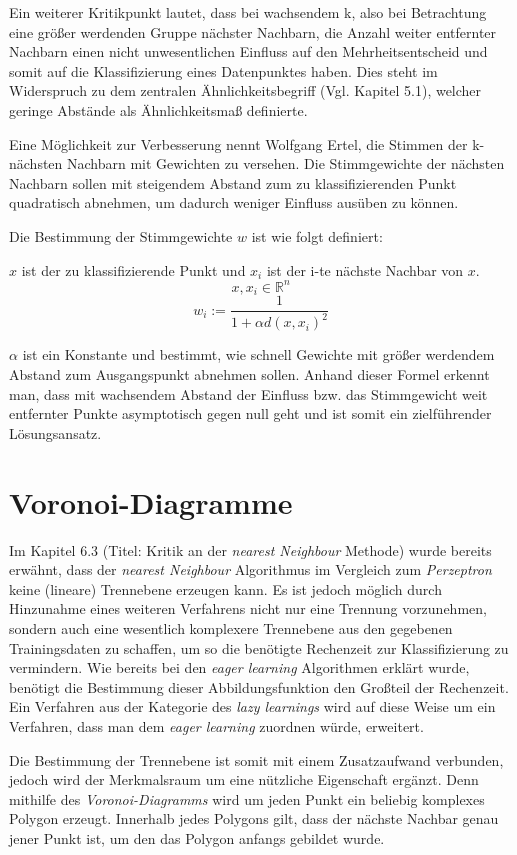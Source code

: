 \documentclass[fontsize=11pt]{scrartcl}
\begin{document}
                Ein weiterer Kritikpunkt lautet, dass bei wachsendem k, also bei Betrachtung eine größer werdenden Gruppe nächster Nachbarn, die Anzahl weiter entfernter Nachbarn einen nicht unwesentlichen Einfluss auf den Mehrheitsentscheid und somit auf die Klassifizierung eines Datenpunktes haben. Dies steht im Widerspruch zu dem zentralen Ähnlichkeitsbegriff (Vgl. Kapitel 5.1), welcher geringe Abstände als Ähnlichkeitsmaß definierte.\par
                Eine Möglichkeit zur Verbesserung nennt Wolfgang Ertel, die Stimmen der k-nächsten Nachbarn mit Gewichten zu versehen. Die Stimmgewichte der nächsten Nachbarn sollen mit steigendem Abstand zum zu klassifizierenden Punkt quadratisch abnehmen, um dadurch weniger Einfluss ausüben zu können.\cite{ertel2016_p212}\par
                        
                Die Bestimmung der Stimmgewichte $w$ ist wie folgt definiert:\par
                $x$ ist der zu klassifizierende Punkt und $x_i$ ist der i-te nächste Nachbar von $x$.
                $$
                    x,x_i \in \mathbb{R}^n
                $$
                $$
                    w_i:=\frac{1}{1+\alpha d(x,x_i)^2}
                $$
                \par
                $\alpha$ ist ein Konstante und bestimmt, wie schnell Gewichte mit größer werdendem Abstand zum Ausgangspunkt abnehmen sollen.\cite{ertel2016_p212} Anhand dieser Formel erkennt man, dass mit wachsendem Abstand der Einfluss bzw. das Stimmgewicht weit entfernter Punkte asymptotisch gegen null geht und ist somit ein zielführender Lösungsansatz.\cite{ertel2016_p212}\par
        \section{Voronoi-Diagramme}
            Im Kapitel 6.3 (Titel: Kritik an der \emph{nearest Neighbour} Methode) wurde bereits erwähnt, dass der \emph{nearest Neighbour} Algorithmus im Vergleich zum \emph{Perzeptron} keine (lineare) Trennebene erzeugen kann. Es ist jedoch möglich durch Hinzunahme eines weiteren Verfahrens nicht nur eine Trennung vorzunehmen, sondern auch eine wesentlich komplexere Trennebene aus den gegebenen Trainingsdaten zu schaffen, um so die benötigte Rechenzeit zur Klassifizierung zu vermindern.\cite{ertel2016_p209}
            Wie bereits bei den \emph{eager learning} Algorithmen erklärt wurde, benötigt die Bestimmung dieser Abbildungsfunktion den Großteil der Rechenzeit. Ein Verfahren aus der Kategorie des \emph{lazy learnings} wird auf diese Weise um ein Verfahren, dass man dem \emph{eager learning} zuordnen würde, erweitert.\par Die Bestimmung der Trennebene ist somit mit einem Zusatzaufwand verbunden, jedoch wird der Merkmalsraum um eine nützliche Eigenschaft ergänzt. Denn mithilfe des \emph{Voronoi-Diagramms} wird um jeden Punkt ein beliebig komplexes Polygon erzeugt. Innerhalb jedes Polygons gilt, dass der nächste Nachbar genau jener Punkt ist, um den das Polygon anfangs gebildet wurde.\cite{ertel2016_p208} \par
            
\end{document}

